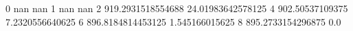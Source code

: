 0 nan nan
1 nan nan
2 919.2931518554688 24.01983642578125
4 902.50537109375 7.2320556640625
6 896.8184814453125 1.545166015625
8 895.2733154296875 0.0
